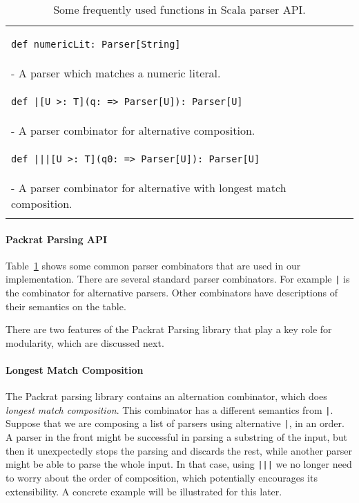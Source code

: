 \begin{table}[t]
\begin{tabular}{l}
\hline
\begin{lstlisting}
def numericLit: Parser[String]
\end{lstlisting} \\
\hspace{.2in}- A parser which matches a numeric literal. \\
\hline
\begin{lstlisting}
def |[U >: T](q: => Parser[U]): Parser[U]
\end{lstlisting} \\
\hspace{.2in}- A parser combinator for alternative composition. \\
\hline
\begin{lstlisting}
def |||[U >: T](q0: => Parser[U]): Parser[U]
\end{lstlisting} \\
\hspace{.2in}- A parser combinator for alternative with longest match composition. \\
\hline \\
\end{tabular}
\caption{Some frequently used functions in Scala parser API.}\label{tab1}
\end{table}

\paragraph{Packrat Parsing API} Table~\ref{tab1} shows some common parser combinators
that are used in our implementation.  There are several standard
parser combinators. For example \lstinline{|} is the combinator for
alternative parsers. Other combinators have descriptions of their
semantics on the table.

There are two features of the Packrat Parsing library that play a key role
for modularity, which are discussed next.

\paragraph{Longest Match Composition} The Packrat parsing library 
contains an alternation combinator, which does \emph{longest match
  composition}. This combinator has a different semantics from
\lstinline{|}.
Suppose that we are composing a list of parsers using alternative
\lstinline{|}, in an order. A parser in the front might be successful
in parsing a substring of the input, but then it unexpectedly stops
the parsing and discards the rest, while another parser might be able
to parse the whole input. In that case, using \lstinline{|||} we no
longer need to worry about the order of composition, which potentially
encourages its extensibility. A concrete example will be illustrated
for this later. 

